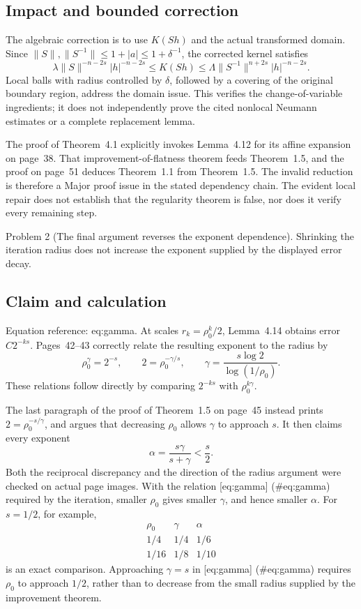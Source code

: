 \documentclass[10pt]{article}
\begin{document}
\subsection*{Impact and bounded correction}
The algebraic correction is to use \(K(Sh)\) and the actual transformed domain. Since \(\|S\|,\|S^{-1}\|\le1+|a|\le1+\delta^{-1}\), the corrected kernel satisfies \[\lambda\|S\|^{-n-2s}|h|^{-n-2s}
 \le K(Sh)\le
 \Lambda\|S^{-1}\|^{n+2s}|h|^{-n-2s}.\] Local balls with radius controlled by \(\delta\), followed by a covering of the original boundary region, address the domain issue. This verifies the change-of-variable ingredients; it does not independently prove the cited nonlocal Neumann estimates or a complete replacement lemma.\par
The proof of Theorem 4.1 explicitly invokes Lemma 4.12 for its affine expansion on page 38. That improvement-of-flatness theorem feeds Theorem 1.5, and the proof on page 51 deduces Theorem 1.1 from Theorem 1.5. The invalid reduction is therefore a Major proof issue in the stated dependency chain. The evident local repair does not establish that the regularity theorem is false, nor does it verify every remaining step.\par
Problem 2 (The final argument reverses the exponent dependence).  Shrinking the iteration radius does not increase the exponent supplied by the displayed error decay.\par
\subsection*{Claim and calculation}
Equation reference: eq:gamma. At scales \(r_k=\rho_0^k/2\), Lemma 4.14 obtains error \(C2^{-ks}\). Pages 42–43 correctly relate the resulting exponent to the radius by \[
 \rho_0^\gamma=2^{-s},
 \qquad
 2=\rho_0^{-\gamma/s},
 \qquad
 \gamma=\frac{s\log2}{\log(1/\rho_0)}.\] These relations follow directly by comparing \(2^{-ks}\) with \(\rho_0^{k\gamma}\).\par
The last paragraph of the proof of Theorem 1.5 on page 45 instead prints \(2=\rho_0^{-s/\gamma}\), and argues that decreasing \(\rho_0\) allows \(\gamma\) to approach \(s\). It then claims every exponent \[\alpha=\frac{s\gamma}{s+\gamma}<\frac{s}{2}.\] Both the reciprocal discrepancy and the direction of the radius argument were checked on actual page images. With the relation [eq:gamma] (\#eq:gamma) required by the iteration, smaller \(\rho_0\) gives smaller \(\gamma\), and hence smaller \(\alpha\). For \(s=1/2\), for example, \[\begin{array}{c|cc}
 \rho_0&\gamma&\alpha\\ \hline
 1/4&1/4&1/6\\
 1/16&1/8&1/10
\end{array}\] is an exact comparison. Approaching \(\gamma=s\) in [eq:gamma] (\#eq:gamma) requires \(\rho_0\) to approach \(1/2\), rather than to decrease from the small radius supplied by the improvement theorem.\par
\end{document}

